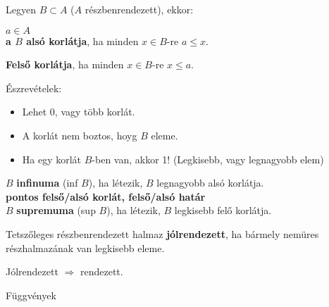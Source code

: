 \begin{frame}
\begin{tcolorbox}[title={Def.: Alsó korlát, Felső korlát}]
Legyen $B \subset A$ ($A$ részbenrendezett), ekkor:\\
\msmallskip

$a \in A$\\
\textbf{a $B$ alsó korlátja}, ha minden $x \in B$-re $a \leq x$.\\
\mmedskip

\textbf{Felső korlátja}, ha minden $x \in B$-re $x \leq a$.\\
\mmedskip

Észrevételek:\\
\begin{itemize}
\item Lehet 0, vagy több korlát.
\item A korlát nem boztos, hoyg $B$ eleme.
\item Ha egy korlát $B$-ben van, akkor 1! (Legkisebb, vagy legnagyobb elem)
\end{itemize}
\end{tcolorbox}

\begin{tcolorbox}[title={Def.: Infinum, Supremum}]
$B$ \textbf{infinuma} (inf $B$), ha létezik, $B$ legnagyobb alsó korlátja.\\
\textbf{pontos felső/alsó korlát, felső/alsó határ}\\
$B$ \textbf{supremuma} (sup $B$), ha létezik, $B$ legkisebb felő korlátja.
\end{tcolorbox}

\begin{tcolorbox}[title={Def.: Jólrendezett halmaz}]
Tetszőleges részbenrendezett halmaz \textbf{jólrendezett}, ha bármely nemüres részhalmazának van legkisebb eleme.
\end{tcolorbox}

\begin{tcolorbox}[title={Ész}]
Jólrendezett $\Rightarrow$ rendezett.
\end{tcolorbox}
\end{frame}


\begin{frame}[plain]
\begin{tcolorbox}[center, colback={myyellow}, coltext={black}, colframe={myyellow}]
    {\Huge Függvények}
    \mmedskip
\end{tcolorbox}
\end{frame}

